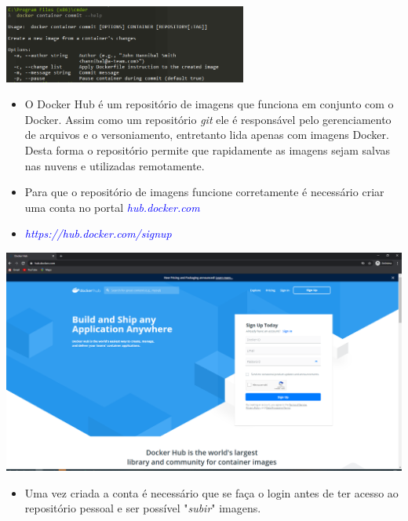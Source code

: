 \documentclass[10pt]{beamer}
\theoremstyle{remark}
\theoremstyle{definition}
\begin{document}
\begin{frame}[allowframebreaks]
	\begin{center}
		\includegraphics[width=0.6\textwidth]{images/17.png}
	\end{center}
	
	\framebreak

	\begin{itemize}
		\item O Docker Hub é um repositório de imagens que funciona em conjunto com o Docker. Assim como um repositório \textit{git} ele é responsável pelo gerenciamento de arquivos e o versoniamento, entretanto lida apenas com imagens Docker. Desta forma o repositório permite que rapidamente as imagens sejam salvas nas nuvens e utilizadas remotamente.
		
		\item Para que o repositório de imagens funcione corretamente é necessário criar uma conta no portal \textcolor{blue}{\textit{hub.docker.com}}
		
		\item \textcolor{blue}{\textit{https://hub.docker.com/signup}}
	\end{itemize}
		
	\framebreak
		
	\begin{center}
		\includegraphics[width=1\textwidth]{images/15.png}
	\end{center}
	
	\framebreak
	
	\begin{itemize}
		\item Uma vez criada a conta é necessário que se faça o login antes de ter acesso ao repositório pessoal e ser possível "\textit{subir}" imagens.
		

\end{itemize}
\end{frame}
\end{document}
